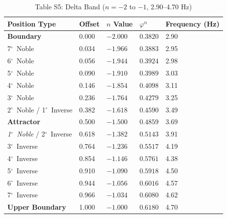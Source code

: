 \documentclass[11pt,a4paper]{article}
\newcommand{\degree}{$^\circ$}  %
\begin{document}
\begin{table}[H]
\centering
\caption*{Table S5: Delta Band ($n = -2$ to $-1$, 2.90--4.70 Hz)}
\begin{tabular}{@{}lllll@{}}
\toprule
Position Type & Offset & $n$ Value & $\varphi^n$ & Frequency (Hz) \\
\midrule
\textbf{Boundary} & 0.000 & $-2.000$ & $0.3820$ & 2.90 \\
7\degree\ Noble & 0.034 & $-1.966$ & $0.3883$ & 2.95 \\
6\degree\ Noble & 0.056 & $-1.944$ & $0.3924$ & 2.98 \\
5\degree\ Noble & 0.090 & $-1.910$ & $0.3989$ & 3.03 \\
4\degree\ Noble & 0.146 & $-1.854$ & $0.4098$ & 3.11 \\
3\degree\ Noble & 0.236 & $-1.764$ & $0.4279$ & 3.25 \\
2\degree\ Noble / 1\degree\ Inverse & 0.382 & $-1.618$ & $0.4590$ & 3.49 \\
\textbf{Attractor} & 0.500 & $-1.500$ & $0.4859$ & 3.69 \\
\textit{1\degree\ Noble} / 2\degree\ Inverse & 0.618 & $-1.382$ & $0.5143$ & 3.91 \\
3\degree\ Inverse & 0.764 & $-1.236$ & $0.5517$ & 4.19 \\
4\degree\ Inverse & 0.854 & $-1.146$ & $0.5761$ & 4.38 \\
5\degree\ Inverse & 0.910 & $-1.090$ & $0.5918$ & 4.50 \\
6\degree\ Inverse & 0.944 & $-1.056$ & $0.6016$ & 4.57 \\
7\degree\ Inverse & 0.966 & $-1.034$ & $0.6080$ & 4.62 \\
\textbf{Upper Boundary} & 1.000 & $-1.000$ & $0.6180$ & 4.70 \\
\bottomrule
\end{tabular}
\end{table}
\end{document}

